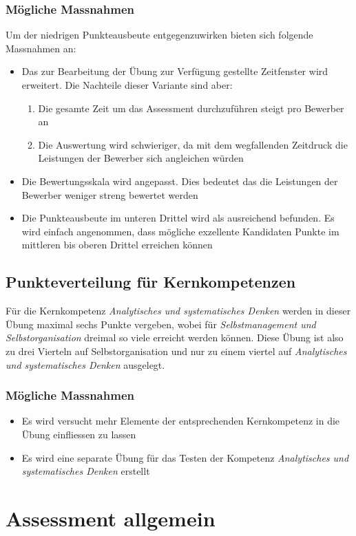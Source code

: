 \subsubsection{Mögliche Massnahmen}
Um der niedrigen Punkteausbeute entgegenzuwirken bieten sich folgende Massnahmen an:
\begin{itemize}
\item Das zur Bearbeitung der Übung zur Verfügung gestellte Zeitfenster wird erweitert. Die Nachteile dieser Variante sind aber:
\begin{enumerate}
\item Die gesamte Zeit um das Assessment durchzuführen steigt pro Bewerber an
\item Die Auswertung wird schwieriger, da mit dem wegfallenden Zeitdruck die Leistungen der Bewerber sich angleichen würden
\end{enumerate}
\item Die Bewertungsskala wird angepasst. Dies bedeutet das die Leistungen der Bewerber weniger streng bewertet werden
\item Die Punkteausbeute im unteren Drittel wird als ausreichend befunden. Es wird einfach angenommen, dass mögliche exzellente Kandidaten Punkte im mittleren bis oberen Drittel erreichen können
\end{itemize} 
\subsection{Punkteverteilung für Kernkompetenzen}
Für die Kernkompetenz \textit{Analytisches und systematisches Denken} werden in dieser Übung maximal sechs Punkte vergeben, wobei für \textit{Selbstmanagement und Selbstorganisation} dreimal so viele erreicht werden können. Diese Übung ist also zu drei Vierteln auf Selbstorganisation und nur zu einem viertel auf \textit{Analytisches und systematisches Denken} ausgelegt.
\subsubsection{Mögliche Massnahmen}
\begin{itemize}
\item Es wird versucht mehr Elemente der entsprechenden Kernkompetenz in die Übung einfliessen zu lassen
\item Es wird eine separate Übung für das Testen der Kompetenz \textit{Analytisches und systematisches Denken} erstellt
\end{itemize}
\section{Assessment allgemein}
